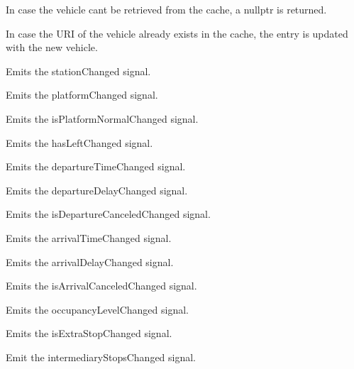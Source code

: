 In case the vehicle can\textquotesingle{}t be retrieved from the cache, a nullptr is returned.

In case the U\+RI of the vehicle already exists in the cache, the entry is updated with the new vehicle.

Emits the station\+Changed signal.

Emits the platform\+Changed signal.

Emits the is\+Platform\+Normal\+Changed signal.

Emits the has\+Left\+Changed signal.

Emits the departure\+Time\+Changed signal.

Emits the departure\+Delay\+Changed signal.

Emits the is\+Departure\+Canceled\+Changed signal.

Emits the arrival\+Time\+Changed signal.

Emits the arrival\+Delay\+Changed signal.

Emits the is\+Arrival\+Canceled\+Changed signal.

Emits the occupancy\+Level\+Changed signal.

Emits the is\+Extra\+Stop\+Changed signal.

Emit the intermediary\+Stops\+Changed signal. 
